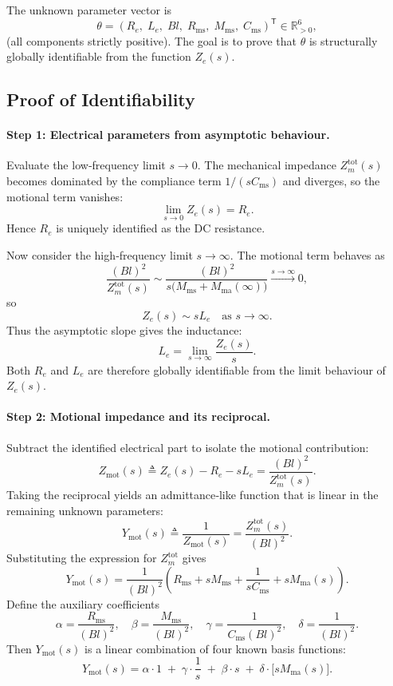The unknown parameter vector is
\[
\theta = (R_e,\; L_e,\; Bl,\; R_{\mathrm{ms}},\; M_{\mathrm{ms}},\; C_{\mathrm{ms}})^\mathsf{T} \in \mathbb{R}_{>0}^6,
\]
(all components strictly positive). The goal is to prove that $\theta$ is structurally globally identifiable from the function $Z_e(s)$.

\subsection*{Proof of Identifiability}

\paragraph{Step 1: Electrical parameters from asymptotic behaviour.}
Evaluate the low‑frequency limit $s \to 0$. The mechanical impedance $Z_m^{\mathrm{tot}}(s)$ becomes dominated by the compliance term $1/(s C_{\mathrm{ms}})$ and diverges, so the motional term vanishes:
\[
\lim_{s\to 0} Z_e(s) = R_e.
\]
Hence $R_e$ is uniquely identified as the DC resistance.

Now consider the high‑frequency limit $s \to \infty$. The motional term behaves as
\[
\frac{(Bl)^2}{Z_m^{\mathrm{tot}}(s)} \sim \frac{(Bl)^2}{s\bigl(M_{\mathrm{ms}}+M_{\mathrm{ma}}(\infty)\bigr)} \xrightarrow{s\to\infty} 0,
\]
so
\[
Z_e(s) \sim s L_e \quad \text{as } s \to \infty.
\]
Thus the asymptotic slope gives the inductance:
\[
L_e = \lim_{s\to\infty} \frac{Z_e(s)}{s}.
\]
Both $R_e$ and $L_e$ are therefore globally identifiable from the limit behaviour of $Z_e(s)$.

\paragraph{Step 2: Motional impedance and its reciprocal.}
Subtract the identified electrical part to isolate the motional contribution:
\[
Z_{\mathrm{mot}}(s) \triangleq Z_e(s) - R_e - s L_e = \frac{(Bl)^2}{Z_m^{\mathrm{tot}}(s)}.
\]
Taking the reciprocal yields an admittance‑like function that is linear in the remaining unknown parameters:
\[
Y_{\mathrm{mot}}(s) \triangleq \frac{1}{Z_{\mathrm{mot}}(s)} = \frac{Z_m^{\mathrm{tot}}(s)}{(Bl)^2}.
\]
Substituting the expression for $Z_m^{\mathrm{tot}}$ gives
\[
Y_{\mathrm{mot}}(s) = \frac{1}{(Bl)^2}\left( R_{\mathrm{ms}} + s M_{\mathrm{ms}} + \frac{1}{s C_{\mathrm{ms}}} + s M_{\mathrm{ma}}(s) \right).
\]
Define the auxiliary coefficients
\[
\alpha = \frac{R_{\mathrm{ms}}}{(Bl)^2},\quad
\beta  = \frac{M_{\mathrm{ms}}}{(Bl)^2},\quad
\gamma = \frac{1}{C_{\mathrm{ms}}(Bl)^2},\quad
\delta = \frac{1}{(Bl)^2}.
\]
Then $Y_{\mathrm{mot}}(s)$ is a linear combination of four known basis functions:
\[
\boxed{
Y_{\mathrm{mot}}(s) = \alpha \cdot 1 \;+\; \gamma \cdot \frac{1}{s} \;+\; \beta \cdot s \;+\; \delta \cdot \bigl[ s M_{\mathrm{ma}}(s) \bigr].
}
\]

